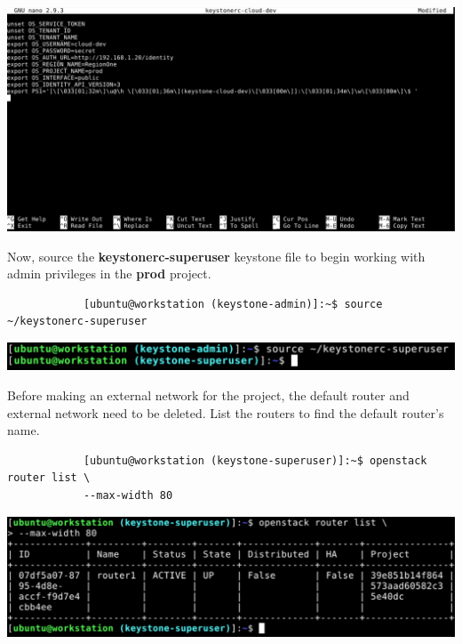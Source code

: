 \documentclass[letterpaper, 12pt]{article}
\begin{document}
\begin{enumerate}
\begin{labstep}
        \begin{center}
            \includegraphics[width=\linewidth]{images/part1/step12.png}
        \end{center}
    \end{labstep}

    \begin{labstep}
        Now, source the \textbf{keystonerc-superuser} keystone file to begin working with admin privileges in the \textbf{prod} project.
        \begin{lstlisting}
            [ubuntu@workstation (keystone-admin)]:~$ source ~/keystonerc-superuser
        \end{lstlisting}

        \begin{center}
            \includegraphics[width=\linewidth]{images/part1/step13.png}
        \end{center}
    \end{labstep}

    \begin{labstep}
        Before making an external network for the project, the default router and external network need to be deleted.
        List the routers to find the default router's name.
        \begin{lstlisting}
            [ubuntu@workstation (keystone-superuser)]:~$ openstack router list \
            --max-width 80
        \end{lstlisting}

        \begin{center}
            \includegraphics[width=\linewidth]{images/part1/step14.png}
        \end{center}
    \end{labstep}


\end{enumerate}
\end{document}
